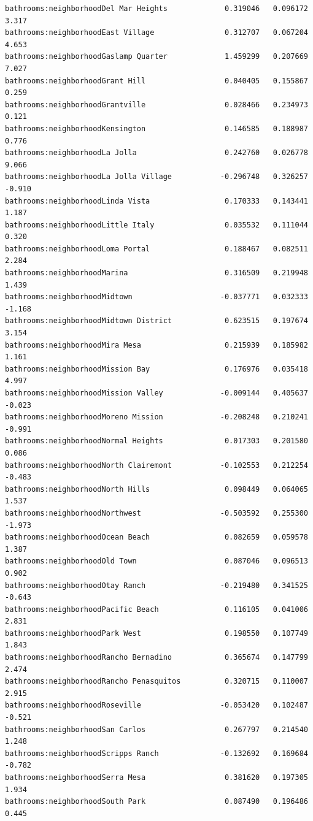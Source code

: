 \documentclass[
  letterpaper,
  DIV=11,
  numbers=noendperiod,
  oneside]{scrreprt}
\begin{document}
\begin{verbatim}
bathrooms:neighborhoodDel Mar Heights             0.319046   0.096172   3.317
bathrooms:neighborhoodEast Village                0.312707   0.067204   4.653
bathrooms:neighborhoodGaslamp Quarter             1.459299   0.207669   7.027
bathrooms:neighborhoodGrant Hill                  0.040405   0.155867   0.259
bathrooms:neighborhoodGrantville                  0.028466   0.234973   0.121
bathrooms:neighborhoodKensington                  0.146585   0.188987   0.776
bathrooms:neighborhoodLa Jolla                    0.242760   0.026778   9.066
bathrooms:neighborhoodLa Jolla Village           -0.296748   0.326257  -0.910
bathrooms:neighborhoodLinda Vista                 0.170333   0.143441   1.187
bathrooms:neighborhoodLittle Italy                0.035532   0.111044   0.320
bathrooms:neighborhoodLoma Portal                 0.188467   0.082511   2.284
bathrooms:neighborhoodMarina                      0.316509   0.219948   1.439
bathrooms:neighborhoodMidtown                    -0.037771   0.032333  -1.168
bathrooms:neighborhoodMidtown District            0.623515   0.197674   3.154
bathrooms:neighborhoodMira Mesa                   0.215939   0.185982   1.161
bathrooms:neighborhoodMission Bay                 0.176976   0.035418   4.997
bathrooms:neighborhoodMission Valley             -0.009144   0.405637  -0.023
bathrooms:neighborhoodMoreno Mission             -0.208248   0.210241  -0.991
bathrooms:neighborhoodNormal Heights              0.017303   0.201580   0.086
bathrooms:neighborhoodNorth Clairemont           -0.102553   0.212254  -0.483
bathrooms:neighborhoodNorth Hills                 0.098449   0.064065   1.537
bathrooms:neighborhoodNorthwest                  -0.503592   0.255300  -1.973
bathrooms:neighborhoodOcean Beach                 0.082659   0.059578   1.387
bathrooms:neighborhoodOld Town                    0.087046   0.096513   0.902
bathrooms:neighborhoodOtay Ranch                 -0.219480   0.341525  -0.643
bathrooms:neighborhoodPacific Beach               0.116105   0.041006   2.831
bathrooms:neighborhoodPark West                   0.198550   0.107749   1.843
bathrooms:neighborhoodRancho Bernadino            0.365674   0.147799   2.474
bathrooms:neighborhoodRancho Penasquitos          0.320715   0.110007   2.915
bathrooms:neighborhoodRoseville                  -0.053420   0.102487  -0.521
bathrooms:neighborhoodSan Carlos                  0.267797   0.214540   1.248
bathrooms:neighborhoodScripps Ranch              -0.132692   0.169684  -0.782
bathrooms:neighborhoodSerra Mesa                  0.381620   0.197305   1.934
bathrooms:neighborhoodSouth Park                  0.087490   0.196486   0.445

\end{verbatim}
\end{document}
